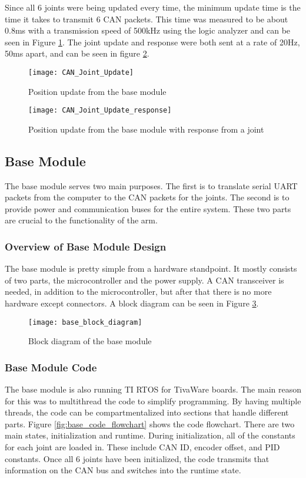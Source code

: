 \noindent Since all 6 joints were being updated every time, the minimum update time is the time it takes to transmit 6 CAN packets. This time was measured to be about 0.8ms with a transmission speed of 500kHz using the logic analyzer and can be seen in Figure \ref{fig:can_joint_update}. The joint update and response were both sent at a rate of 20Hz, 50ms apart, and can be seen in figure \ref{fig:can_joint_update_response}.

\begin{figure}[H]
	\centering
	\texttt{[image: CAN\_Joint\_Update]}
	\caption{Position update from the base module}
	\label{fig:can_joint_update}
\end{figure}

\begin{figure}[H]
	\centering
	\texttt{[image: CAN\_Joint\_Update\_response]}
	\caption{Position update from the base module with response from a joint}
	\label{fig:can_joint_update_response}
\end{figure}

\subsection{Base Module}
The base module serves two main purposes. The first is to translate serial UART packets from the computer to the CAN packets for the joints. The second is to provide power and communication buses for the entire system. These two parts are crucial to the functionality of the arm.

\subsubsection{Overview of Base Module Design}
The base module is pretty simple from a hardware standpoint. It mostly consists of two parts, the microcontroller and the power supply. A CAN transceiver is needed, in addition to the microcontroller, but after that there is no more hardware except connectors. A block diagram can be seen in Figure \ref{fig:base_block_diagram}.

\begin{figure}[H]
	\centering
	\texttt{[image: base\_block\_diagram]}
	\caption{Block diagram of the base module}
	\label{fig:base_block_diagram}
\end{figure}

\subsubsection{Base Module Code}
The base module is also running TI RTOS for TivaWare boards. The main reason for this was to multithread the code to simplify programming. By having multiple threads, the code can be compartmentalized into sections that handle different parts. Figure \ref{fig:base_code_flowchart} shows the code flowchart. There are two main states, initialization and runtime. During initialization, all of the constants for each joint are loaded in. These include CAN ID, encoder offset, and PID constants. Once all 6 joints have been initialized, the code transmits that information on the CAN bus and switches into the runtime state. 


